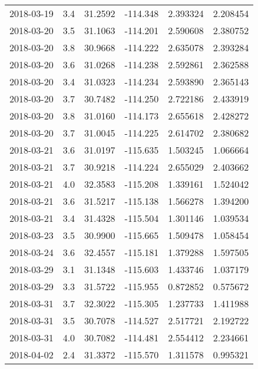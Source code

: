 \begin{tabular}{lrrrrr}
2018-03-19 &       3.4 &  31.2592 &  -114.348 &         2.393324 &         2.208454 \\
2018-03-20 &       3.5 &  31.1063 &  -114.201 &         2.590608 &         2.380752 \\
2018-03-20 &       3.8 &  30.9668 &  -114.222 &         2.635078 &         2.393284 \\
2018-03-20 &       3.6 &  31.0268 &  -114.238 &         2.592861 &         2.362588 \\
2018-03-20 &       3.4 &  31.0323 &  -114.234 &         2.593890 &         2.365143 \\
2018-03-20 &       3.7 &  30.7482 &  -114.250 &         2.722186 &         2.433919 \\
2018-03-20 &       3.8 &  31.0160 &  -114.173 &         2.655618 &         2.428272 \\
2018-03-20 &       3.7 &  31.0045 &  -114.225 &         2.614702 &         2.380682 \\
2018-03-21 &       3.6 &  31.0197 &  -115.635 &         1.503245 &         1.066664 \\
2018-03-21 &       3.7 &  30.9218 &  -114.224 &         2.655029 &         2.403662 \\
2018-03-21 &       4.0 &  32.3583 &  -115.208 &         1.339161 &         1.524042 \\
2018-03-21 &       3.6 &  31.5217 &  -115.138 &         1.566278 &         1.394200 \\
2018-03-21 &       3.4 &  31.4328 &  -115.504 &         1.301146 &         1.039534 \\
2018-03-23 &       3.5 &  30.9900 &  -115.665 &         1.509478 &         1.058454 \\
2018-03-24 &       3.6 &  32.4557 &  -115.181 &         1.379288 &         1.597505 \\
2018-03-29 &       3.1 &  31.1348 &  -115.603 &         1.433746 &         1.037179 \\
2018-03-29 &       3.3 &  31.5722 &  -115.955 &         0.872852 &         0.575672 \\
2018-03-31 &       3.7 &  32.3022 &  -115.305 &         1.237733 &         1.411988 \\
2018-03-31 &       3.5 &  30.7078 &  -114.527 &         2.517721 &         2.192722 \\
2018-03-31 &       4.0 &  30.7082 &  -114.481 &         2.554412 &         2.234661 \\
2018-04-02 &       2.4 &  31.3372 &  -115.570 &         1.311578 &         0.995321 \\

\end{tabular}
